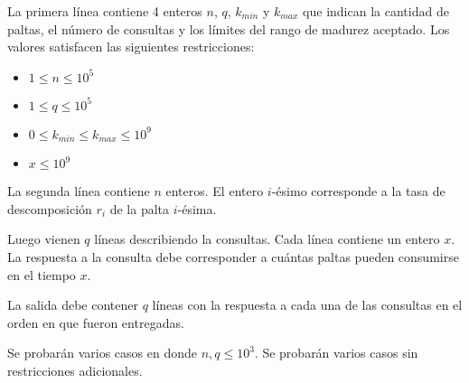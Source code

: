 \documentclass{oci}
\begin{document}
\begin{inputDescription}

La primera línea contiene 4 enteros
$n$, $q$, $k_{min}$ y $k_{max}$
que indican la cantidad de paltas, el número de consultas y los límites del rango de madurez aceptado.
Los valores satisfacen las siguientes restricciones:

\begin{itemize}
  \item $1 \leq n \leq 10^5$
  \item $1 \leq q \leq 10^5$
  \item $0 \leq k_{min} \leq k_{max} \leq 10^9$
  \item $x \leq 10^9$
\end{itemize}

La segunda línea contiene $n$ enteros.
El entero $i$-ésimo corresponde a la tasa de descomposición $r_i$
de la palta $i$-ésima.

Luego vienen $q$ líneas describiendo la consultas.
Cada línea contiene un entero $x$.
La respuesta a la consulta debe corresponder a cuántas paltas pueden consumirse
en el tiempo $x$.

\end{inputDescription}

\begin{outputDescription}
La salida debe contener $q$ líneas con la respuesta a cada una de las consultas en el orden en que
fueron entregadas.
\end{outputDescription}

\begin{scoreDescription}
  Se probarán varios casos en donde $n, q \leq 10^3$.
  Se probarán varios casos sin restricciones adicionales.
\end{scoreDescription}
\end{document}
